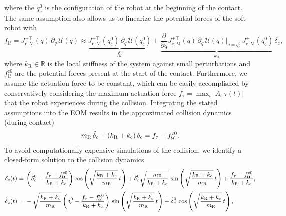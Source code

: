 where the $q_{\mathrm{c}}^0$ is the configuration of the robot at the beginning of the contact.
The same assumption also allows us to linearize the potential forces of the soft robot with 
\begin{equation}\label{eq:safetymetric:collision_potential_forces}
    f_{\mathcal{U}} = J_\mathrm{c,M}^{+\top}(q) \, \partial_{q} \, \mathcal{U}(q) \approx \underbrace{J_\mathrm{c,M}^{+\top}(q_{\mathrm{c}}^0) \, \partial_{q} \, \mathcal{U}(q_{\mathrm{c}}^0)}_{f_{\mathcal{U}}^{\mathrm{c}0}} + \underbrace{\frac{\partial}{\partial q} J_\mathrm{c,M}^{+\top}(q) \, \partial_{q} \, \mathcal{U}(q) \Big |_{q=q_{\mathrm{c}}^0} \,  J_\mathrm{c,M}^{+}(q_{\mathrm{c}}^0)}_{k_\mathrm{R}}  \, \delta_\mathrm{c},
\end{equation}
where $k_\mathrm{R} \in \mathbb{R}$ is the local stiffness of the system against small perturbations and $f_{\mathcal{U}}^{\mathrm{c}0}$ are the potential forces present at the start of the contact.
Furthermore, we assume the actuation force to be constant, which can be easily accomplished by conservatively considering the maximum actuation force $f_\tau = \max_t \left | A_\mathrm{c} \, \tau(t) \right |$ that the robot experiences during the collision.
Integrating the stated assumptions into the \gls{EOM} results in the approximated collision dynamics (during contact)
\begin{equation}\label{eq:safetymetric:simplified_collision_dynamics}
    m_\mathrm{R} \, \Ddot{\delta}_\mathrm{c} + (k_\mathrm{R} + k_\mathrm{c}) \, \delta_\mathrm{c} = f_\tau - f_{\mathcal{U}}^{\mathrm{c}0}.
\end{equation}
To avoid computationally expensive simulations of the collision, we identify a closed-form solution to the collision dynamics
\begin{equation}\small\label{eq:safetymetric:collision_dynamics_cfs}
\begin{split}
    \delta_\mathrm{c}(t) =& \: \left (\delta_\mathrm{c}^0-\frac{f_\tau-f_{\mathcal{U}}^{\mathrm{c}0}}{k_\mathrm{R} + k_\mathrm{c}} \right ) \cos \left ( \sqrt{\frac{k_\mathrm{R} + k_\mathrm{c}}{m_\mathrm{R}}} \, t \right ) + \dot{\delta}_\mathrm{c}^0 \sqrt{\frac{m_\mathrm{R}}{k_\mathrm{R} + k_\mathrm{c}}} \, \sin \left ( \sqrt{\frac{k_\mathrm{R} + k_\mathrm{c}}{m_\mathrm{R}}} \, t \right ) + \frac{f_\tau-f_{\mathcal{U}}^{\mathrm{c}0}}{k_\mathrm{R} + k_\mathrm{c}},\\
    \dot{\delta}_\mathrm{c}(t) =& \: -\sqrt{\frac{k_\mathrm{R} + k_\mathrm{c}}{m_\mathrm{R}}} \left (\delta_\mathrm{c}^0 - \frac{f_\tau-f_{\mathcal{U}}^{\mathrm{c}0}}{k_\mathrm{R} + k_\mathrm{c}} \right ) \, \sin \left ( \sqrt{\frac{k_\mathrm{R} + k_\mathrm{c}}{m_\mathrm{R}}} \, t \right ) + \dot{\delta}_\mathrm{c}^0 \, \cos \left ( \sqrt{\frac{k_\mathrm{R} + k_\mathrm{c}}{m_\mathrm{R}}} \, t \right ),
\end{split}
\end{equation}

